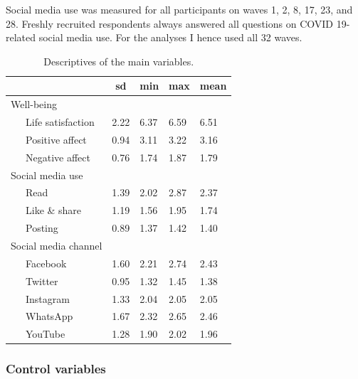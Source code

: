 \documentclass[
  man,floatsintext]{apa7}
\begin{document}
Social media use was measured for all participants on waves 1, 2, 8, 17, 23, and 28.
Freshly recruited respondents always answered all questions on COVID 19-related social media use.
For the analyses I hence used all 32 waves.

\begin{table}[tbp]

\begin{center}
\begin{threeparttable}

\caption{\label{tab:tab-descriptives}Descriptives of the main variables.}

\begin{tabular}{lllll}
\toprule
 & \multicolumn{1}{c}{sd} & \multicolumn{1}{c}{min} & \multicolumn{1}{c}{max} & \multicolumn{1}{c}{mean}\\
\midrule
Well-being &  &  &  & \\
\ \ \ Life satisfaction & 2.22 & 6.37 & 6.59 & 6.51\\
\ \ \ Positive affect & 0.94 & 3.11 & 3.22 & 3.16\\
\ \ \ Negative affect & 0.76 & 1.74 & 1.87 & 1.79\\
Social media use &  &  &  & \\
\ \ \ Read & 1.39 & 2.02 & 2.87 & 2.37\\
\ \ \ Like \& share & 1.19 & 1.56 & 1.95 & 1.74\\
\ \ \ Posting & 0.89 & 1.37 & 1.42 & 1.40\\
Social media channel &  &  &  & \\
\ \ \ Facebook & 1.60 & 2.21 & 2.74 & 2.43\\
\ \ \ Twitter & 0.95 & 1.32 & 1.45 & 1.38\\
\ \ \ Instagram & 1.33 & 2.04 & 2.05 & 2.05\\
\ \ \ WhatsApp & 1.67 & 2.32 & 2.65 & 2.46\\
\ \ \ YouTube & 1.28 & 1.90 & 2.02 & 1.96\\
\bottomrule
\end{tabular}

\end{threeparttable}
\end{center}

\end{table}

\hypertarget{control-variables}{%
\subsubsection{Control variables}\label{control-variables}}
\end{document}
